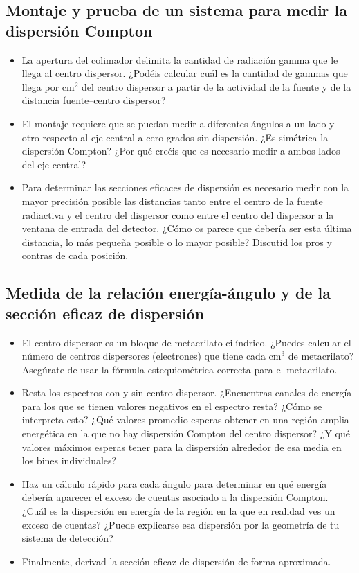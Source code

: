\documentclass[11pt]{article}
\begin{document}
\subsection{Montaje y prueba de un sistema para medir la dispersión Compton}
\begin{itemize}
    \item La apertura del colimador delimita la cantidad de radiación gamma que le llega al centro dispersor. ¿Podéis calcular cuál es la cantidad de gammas que llega por cm\(^2\) del centro dispersor a partir de la actividad de la fuente y de la distancia fuente–centro dispersor?
    \item El montaje requiere que se puedan medir a diferentes ángulos a un lado y otro respecto al eje central a cero grados sin dispersión. ¿Es simétrica la dispersión Compton? ¿Por qué creéis que es necesario medir a ambos lados del eje central?
    \item Para determinar las secciones eficaces de dispersión es necesario medir con la mayor precisión posible las distancias tanto entre el centro de la fuente radiactiva y el centro del dispersor como entre el centro del dispersor a la ventana de entrada del detector. ¿Cómo os parece que debería ser esta última distancia, lo más pequeña posible o lo mayor posible? Discutid los pros y contras de cada posición.
\end{itemize}

\subsection{Medida de la relación energía-ángulo y de la sección eficaz de dispersión}
\begin{itemize}
    \item El centro dispersor es un bloque de metacrilato cilíndrico. ¿Puedes calcular el número de centros dispersores (electrones) que tiene cada cm\(^3\) de metacrilato? Asegúrate de usar la fórmula estequiométrica correcta para el metacrilato.
    \item Resta los espectros con y sin centro dispersor. ¿Encuentras canales de energía para los que se tienen valores negativos en el espectro resta? ¿Cómo se interpreta esto? ¿Qué valores promedio esperas obtener en una región amplia energética en la que no hay dispersión Compton del centro dispersor? ¿Y qué valores máximos esperas tener para la dispersión alrededor de esa media en los bines individuales?
    \item Haz un cálculo rápido para cada ángulo para determinar en qué energía debería aparecer el exceso de cuentas asociado a la dispersión Compton. ¿Cuál es la dispersión en energía de la región en la que en realidad ves un exceso de cuentas? ¿Puede explicarse esa dispersión por la geometría de tu sistema de detección?
    \item Finalmente, derivad la sección eficaz de dispersión de forma aproximada.
\end{itemize}
\end{document}
